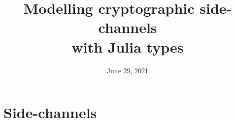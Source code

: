 \def\pathToRoot{./}





\usetikzlibrary{arrows,shadows}
\usepackage{pgf-umlsd}
\usepackage{multirow}
\usepackage{pdfpages}
\usepackage{pgffor}
\usepackage{minted}
\usepackage{algorithm} %
\usepackage{algpseudocode}
\usepackage[absolute]{textpos}


\DeclareMathOperator{\HammingWeight}{HammingWeight}

\title{Modelling cryptographic side-channels \\with Julia types}
\date{June 29, 2021}



\maketitle

\section*{Side-channels}

